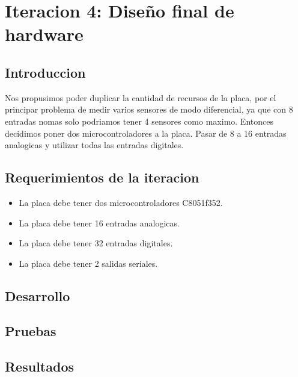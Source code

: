 \chapter{Iteracion 4: Diseño final de hardware} %
\label{cha:iteracion_4}

\section{Introduccion} %
\label{sec:introduccion}

Nos propusimos poder duplicar la cantidad de recursos de la placa, por el principar problema de medir varios sensores de modo diferencial, ya que con 8 entradas nomas solo podriamos tener 4 sensores como maximo. Entonces decidimos poner dos microcontroladores a la placa. Pasar de 8 a 16 entradas analogicas y utilizar todas las entradas digitales. 


\section{Requerimientos de la iteracion} %
\label{sec:requerimientos_de_la_iteracion}

\begin{itemize}
	\item La placa debe tener dos microcontroladores C8051f352.
	\item La placa debe tener 16 entradas analogicas.
	\item La placa debe tener 32 entradas digitales.
	\item La placa debe tener 2 salidas seriales. 
\end{itemize}


\section{Desarrollo} %
\label{sec:desarrollo}


\section{Pruebas} %
\label{sec:pruebas}


\section{Resultados} %
\label{sec:resultados}


